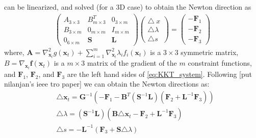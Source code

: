 \documentclass[12pt,a4]{article}
\begin{document}
 can be linearized, and solved (for a 3D case) to obtain the Newton direction as
\begin{align}\label{eq:Lin_KKT}
\left(\begin{array}{ccc}
 A_{3\times3} & B^T_{m\times 3} & 0_{3\times m} \\ 
B_{3\times m}  & 0_{m\times m} & I_{m\times m} \\ 
0_{6\times m} & \textbf{S} & \textbf{L}
\end{array}  \right) \left( \begin{array}{c}
\triangle\ x \\ 
\triangle \lambda \\ 
 \triangle s
\end{array}  \right) = \left( \begin{array}{c}
-\textbf{F}_1 \\ 
-\textbf{F}_2 \\ 
-\textbf{F}_3
\end{array}  \right) 
\end{align}
where, $\textbf{A}=\nabla_{\textbf{x}_t}^2g(\textbf{x}_t)+\sum\limits_{i=1}^{m}\nabla_{\textbf{x}_t}^2\lambda_if_i(\textbf{x}_t)$ is a $3\times3$ symmetric matrix, $B=\nabla_{\textbf{x}_t}\textbf{f}(\textbf{x}_t)$ is a $m\times3$ matrix of the gradient of the $m$ constraint functions, and $\textbf{F}_1$, $\textbf{F}_2$, and $\textbf{F}_3$ are the left hand sides of \cref{eq:KKT_system}. Following [put nilanjan's ieee tro paper] we can obtain the Newton directions as:
\begin{align}\label{eq:Newton-dir}
&\triangle \textbf{x}_t=\textbf{G}^{-1}(-\textbf{F}_1-\textbf{B}^T(\textbf{S}^{-1}\textbf{L})(\textbf{F}_2+\textbf{L}^{-1}\textbf{F}_3)) \nonumber \\
&\triangle\lambda=(\textbf{S}^{-1}\textbf{L})(\textbf{B}\triangle \textbf{x}_t -\textbf{F}_2+\textbf{L}^{-1}\textbf{F}_3)\\
&\triangle s = -\textbf{L}^{-1}(\textbf{F}_3+\textbf{S}\triangle \lambda) \nonumber
\end{align}
\end{document}
